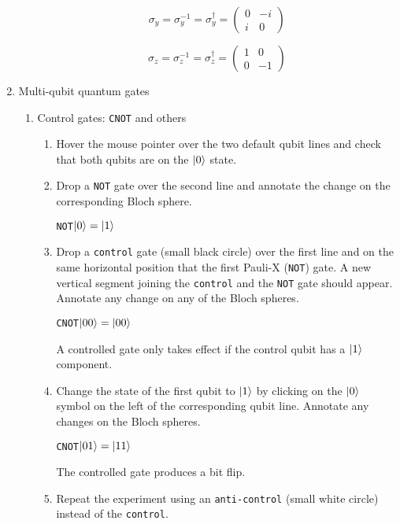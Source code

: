 \documentclass[11pt]{article}
\begin{document}
\begin{enumerate}[label*=\arabic*.]
\begin{enumerate}[label*=\arabic*.]
        $$
        \sigma_y = \sigma^{-1}_y = \sigma^\dagger_y = 
        \begin{pmatrix}
            0 & -i \\
            i & 0
        \end{pmatrix}
        $$

        $$
        \sigma_z = \sigma^{-1}_z = \sigma^\dagger_z = 
        \begin{pmatrix}
            1 & 0 \\
            0 & -1
        \end{pmatrix}
        $$
        
    \end{enumerate}
    \item Multi-qubit quantum gates
    \begin{enumerate}[label*=\arabic*.]
    \item Control gates: \texttt{CNOT} and others
    \begin{enumerate}[label=(\alph*)]
    \item Hover the mouse pointer over the two default qubit lines and check that both qubits are on the $\ket{0}$
    state.
    \item Drop a \texttt{NOT} gate over the second line and annotate the change on the corresponding Bloch sphere.

    \texttt{NOT}$\ket{0}=\ket{1}$
    
    \item Drop a \texttt{control} gate (small black circle) over the first line and on the same horizontal position that
    the first Pauli-X (\texttt{NOT}) gate. A new vertical segment joining the \texttt{control} and the \texttt{NOT} gate should
    appear. Annotate any change on any of the Bloch spheres.

    \texttt{CNOT}$\ket{00}=\ket{00}$

    A controlled gate only takes effect if the control qubit has a $\ket{1}$ component.
    
    \item Change the state of the first qubit to $\ket{1}$ by clicking on the $\ket{0}$ symbol on the left of the corresponding qubit line. Annotate any changes on the Bloch spheres.
    
    \texttt{CNOT}$\ket{01}=\ket{11}$  

    The controlled gate produces a bit flip.
    
\item Repeat the experiment using an \texttt{anti-control} (small white circle) instead of the \texttt{control}.


\end{enumerate}
\end{enumerate}
\end{enumerate}
\end{document}

